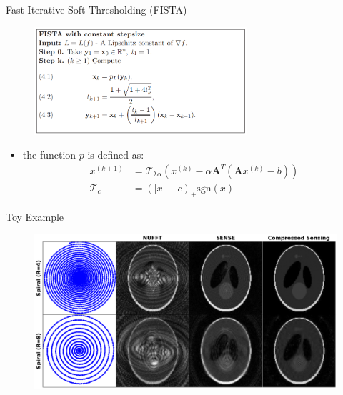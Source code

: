 \documentclass[aspectratio=169]{beamer}
\begin{document}
	\begin{frame}{Fast Iterative Soft Thresholding (FISTA)}
		\begin{figure}
			\centering
			\includegraphics[width=0.7\textwidth]{figures/fista.png}
		\end{figure}
	
		\begin{itemize}
			\item the function $p$ is defined as:
			\begin{align}
				x^{(k+1)} &= \mathcal{T}_{\lambda \alpha} (x^{(k)} - \alpha \mathbf{A}^T (\mathbf{A} x^{(k)} - b)) \\
				\mathcal{T}_c &= (|x| - c)_{+} \text{sgn}(x)
			\end{align}
		\end{itemize}
	\end{frame}
	
	\begin{frame}{Toy Example}
		\begin{figure}
			\centering
			\includegraphics[width=\textwidth]{figures/phan_recon.png}
		\end{figure}
	\end{frame}
	
\end{document}
